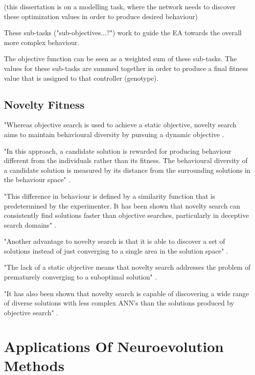 (this dissertation is on a modelling task, where the network needs to discover these optimization values in order to produce desired behaviour) 

These sub-tasks ("sub-objectives...?") work to guide the EA towards the overall more complex behaviour.	

The objective function can be seen as a weighted sum of these sub-tasks. The values for these sub-tasks are summed together in order to produce a final fitness value that is assigned to that controller (genotype). 


\subsection{Novelty Fitness}

"Whereas objective search is used to achieve a static objective, novelty search aims to maintain behavioural diversity by pursuing a dynamic objective \cite{RefWorks:5}.

"In this approach, a candidate solution is rewarded for producing behaviour different from the individuals rather than its fitness. The behavioural diversity of a candidate solution is measured by its distance from the surrounding solutions in the behaviour space" \cite{RefWorks:11}.

"This difference in behaviour is defined by a similarity function that is predetermined by the experimenter. It has been shown that novelty search can consistently find solutions faster than objective searches, particularly in deceptive search domains" \cite{lehman2008exploiting, RefWorks:5}.

"Another advantage to novelty search is that it is able to discover a set of solutions instead of just converging to a single area in the solution space" \cite{RefWorks:11}.

"The lack of a static objective means that novelty search addresses the problem of prematurely converging to a suboptimal solution" \cite{RefWorks:11}.

"It has also been shown that novelty search is capable of discovering a wide range of diverse solutions with less complex ANN's than the solutions produced by objective search" \cite{RefWorks:11}.



\section{Applications Of Neuroevolution Methods}

